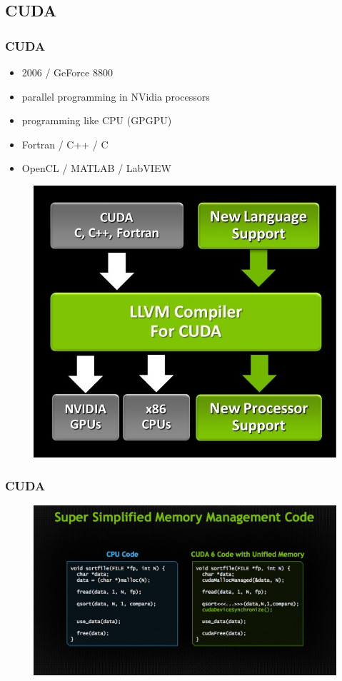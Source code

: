 \documentclass{beamer}
\begin{document}
\subsection{CUDA}
\begin{frame}
\frametitle{CUDA}
\begin{itemize}
	\item 2006 / GeForce 8800
	\item {parallel programming in NVidia processors}
	\item programming like CPU (GPGPU)
	\item Fortran / C++ / C
	\item OpenCL / MATLAB / LabVIEW 
\end{itemize}
\begin{figure}
	\centering
	\includegraphics[scale=0.3]{cuda1}
\end{figure}
\end{frame}
\begin{frame}
	\frametitle{CUDA}
\begin{figure}
	\centering
	\includegraphics[scale=0.25]{cuda2}
\end{figure}
\end{frame}
\end{document}

